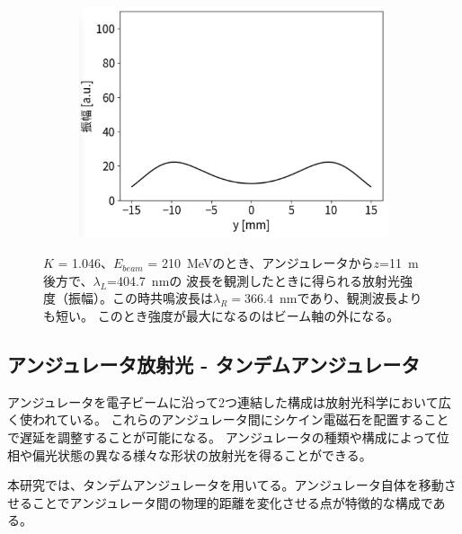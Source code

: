 \documentclass[a4paper,11pt,uplatex]{jsbook}
\begin{document}
\begin{figure}[h]
\begin{subfigure}[h]{0.35\linewidth}
    \includegraphics[width=\linewidth]{image/2-spe_nores_y.png}
  \end{subfigure}
\caption[非共鳴波長でのアンジュレータ放射]{$K$ = 1.046、$E_{beam}$ = 210~MeVのとき、アンジュレータから$z$=11~m後方で、$\lambda_L$=404.7~nmの
波長を観測したときに得られる放射光強度（振幅）。この時共鳴波長は$\lambda_R = 366.4$~nmであり、観測波長よりも短い。
このとき強度が最大になるのはビーム軸の外になる。}\label{fig:noresonance}
\end{figure}

\subsection{アンジュレータ放射光 - タンデムアンジュレータ}\label{sec:tandem}
アンジュレータを電子ビームに沿って2つ連結した構成は放射光科学において広く使われている。
これらのアンジュレータ間にシケイン電磁石を配置することで遅延を調整することが可能になる。
アンジュレータの種類や構成によって位相や偏光状態の異なる様々な形状の放射光を得ることができる\cite{kaneyasu}。

本研究では、タンデムアンジュレータを用いてる。アンジュレータ自体を移動させることでアンジュレータ間の物理的距離を変化させる点が特徴的な構成である。
\end{document}
